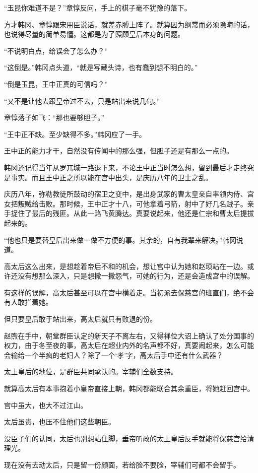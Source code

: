 “玉昆你难道不是？”章惇反问，手上的棋子毫不犹豫的落下。

方才韩冈、章惇跟宋用臣说话，就差赤膊上阵了。就算因为纲常而必须隐晦的话，也说得尽量的简单易懂。这都是为了照顾皇后本身的问题。

“不说明白点，给误会了怎么办？”

“这倒是。”韩冈点头道，“就是写藏头诗，也有蠢到想不明白的。”

“倒是玉昆，王中正真的可信吗？”

“又不是让他去跟皇帝过不去，只是站出来说几句。”

章惇落子如飞：“那也要够胆子。”

“王中正不缺。至少缺得不多。”韩冈应了一手。

王中正的能力才干，自然没有传闻中的那么强，但胆子还是有那么一点的。

韩冈还记得当年从罗兀城一路退下来，不论王中正当时怎么想，留到最后才走终究是事实。而且王中正之所以能在宫中出头，是庆历八年的卫士之乱。

庆历八年，弥勒教徒所鼓动的宿卫之变中，是出身武家的曹太皇亲自率领内侍、宫女把叛贼给击败。那时候，王中正才十八，可他拿着弓箭，射中了好几名贼子。亲手捉住了最后的残匪。从此一路飞黄腾达。真要说起来，他还是仁宗和曹太后提拔起来的。

“他也只是要替皇后出来做一做不方便的事。其余的，自有我辈来解决。”韩冈说道。

高太后这么出来，是想趁着帝后不和的机会，想让宫中认为她和赵顼站在一边。或许还没有想那么深入，只是想撒一撒怨气，可她的行为，还是会造成宫中的误解。

有这样的误解，高太后甚至可以在宫中横着走。当初派去保慈宫的班直们，绝不会有人敢拦着她。

但只要皇后敢于站出来，高太后就只有败退的份。

赵煦在手中，朝堂群臣认定的新天子不离左右，又得禅位大诏上确认了处分国事的权力，由于冬至夜的事，高太后在超业内外的名声都不好，真要闹起来，怎么可能会输给一个半疯的老妇人？除了一个‘孝’字，高太后手中还有什么武器？

太上皇后的地位，是群臣共同承认的。宰辅们全数支持。

就算高太后有本事抱着小皇帝直接上朝，韩冈都能联合其余重臣，将她赶回宫中。

宫中虽大，也大不过江山。

太后虽贵，也压不住他们这些朝臣。

没臣子们的认同，太后也别想站住脚，垂帘听政的太上皇后反手就能将保慈宫给清理光。

现在没有去动太后，只是留一份颜面，若给脸不要脸，宰辅们可都不会留手。

